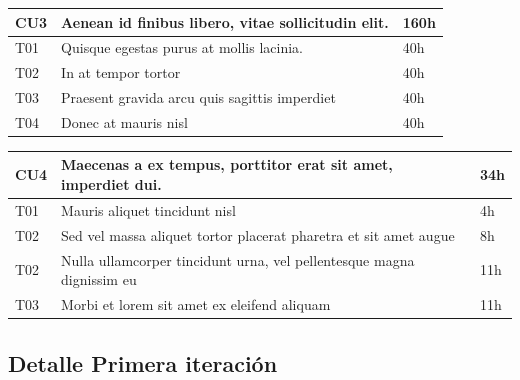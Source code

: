 \documentclass[a4paper, 10pt, twoside]{article}
\begin{document}
\vspace{1em}

\begin{tabular}{lp{13cm}l}
  \hline
  CU3 & Aenean id finibus libero, vitae sollicitudin elit. & 160h \\
  \hline
  T01 & Quisque egestas purus at mollis lacinia. & 40h \\
  T02 & In at tempor tortor & 40h \\
  T03 & Praesent gravida arcu quis sagittis imperdiet & 40h \\
  T04 & Donec at mauris nisl & 40h \\
  \hline
\end{tabular}

\vspace{1em}

\begin{tabular}{lp{13cm}l}
  \hline
  CU4 & Maecenas a ex tempus, porttitor erat sit amet, imperdiet dui. & 34h \\
  \hline
  T01 & Mauris aliquet tincidunt nisl & 4h \\
  T02 & Sed vel massa aliquet tortor placerat pharetra et sit amet augue & 8h \\
  T02 & Nulla ullamcorper tincidunt urna, vel pellentesque magna dignissim eu & 11h \\
  T03 & Morbi et lorem sit amet ex eleifend aliquam & 11h \\
  \hline
\end{tabular}


\subsection{Detalle Primera iteración}
\end{document}
